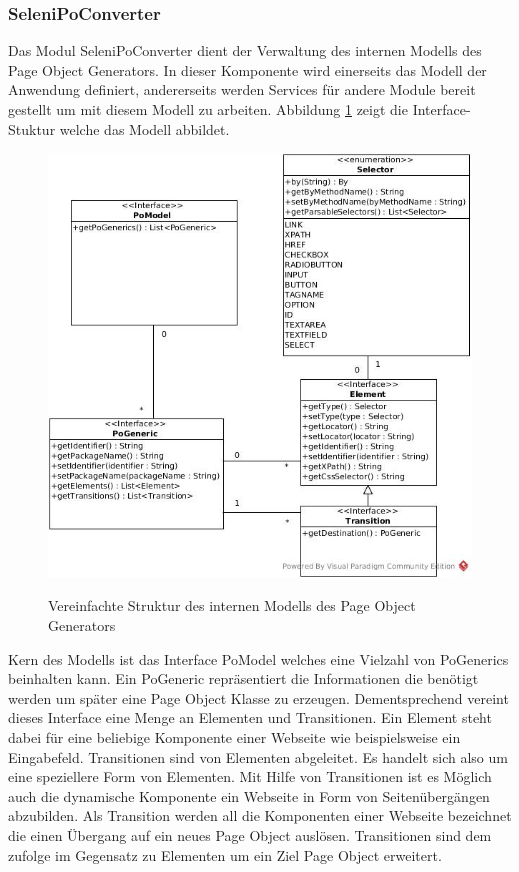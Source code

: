 \subsubsection{SeleniPoConverter}
\label{sec:selenipoconverter}
Das Modul SeleniPoConverter dient der Verwaltung des internen Modells des Page Object Generators. In dieser Komponente wird einerseits das Modell der Anwendung definiert, andererseits werden Services für andere Module bereit gestellt um mit diesem Modell zu arbeiten.
Abbildung \ref{fig:simple_model} zeigt die Interface-Stuktur welche das Modell abbildet.

\begin{figure}[htb]
  \centering  
  \includegraphics[scale=0.46]{img/SimpleModel.jpg}\\
  \caption{Vereinfachte Struktur des internen Modells des Page Object Generators}
  \label{fig:simple_model}
\end{figure}

Kern des Modells ist das Interface PoModel welches eine Vielzahl von PoGenerics beinhalten kann. Ein PoGeneric repräsentiert die Informationen die benötigt werden um später eine Page Object Klasse zu erzeugen. Dementsprechend vereint dieses Interface eine Menge an Elementen und Transitionen.
Ein Element steht dabei für eine beliebige Komponente einer Webseite wie beispielsweise ein Eingabefeld.
Transitionen sind von Elementen abgeleitet. Es handelt sich also um eine speziellere Form von Elementen. Mit Hilfe von Transitionen ist es Möglich auch die dynamische Komponente ein Webseite in Form von Seitenübergängen abzubilden. Als Transition werden all die Komponenten einer Webseite bezeichnet die einen Übergang auf ein neues Page Object auslösen. Transitionen sind dem zufolge im Gegensatz zu Elementen um ein Ziel Page Object erweitert.


